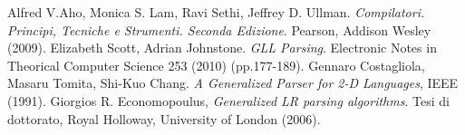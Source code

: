 \begin{thebibliography}{6}
Alfred V.Aho, Monica S. Lam, Ravi Sethi, Jeffrey D. Ullman. \emph{Compilatori. Principi, Tecniche e Strumenti. Seconda Edizione}. Pearson, Addison Wesley (2009).
Elizabeth Scott, Adrian Johnstone. 
\emph{GLL Parsing}. Electronic Notes in Theorical Computer Science 253 (2010) (pp.177-189).
Gennaro Costagliola, Masaru Tomita, Shi-Kuo Chang. \emph{A Generalized Parser for 2-D Languages}, IEEE (1991).
Giorgios R. Economopoulus, \emph{Generalized LR parsing algorithms}. Tesi di dottorato, Royal Holloway, University of London (2006).
\end{thebibliography}